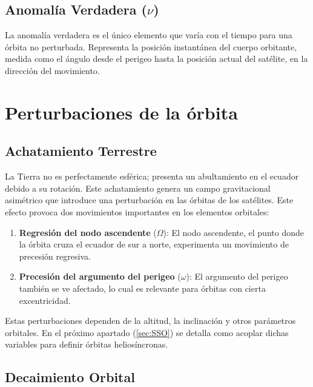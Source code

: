 \subsection{Anomalía Verdadera ($\nu$)}

La anomalía verdadera es el único elemento que varía con el tiempo para una órbita no perturbada. Representa la posición instantánea del cuerpo orbitante, medida como el ángulo desde el perigeo hasta la posición actual del satélite, en la dirección del movimiento.


\section{Perturbaciones de la órbita}

\subsection{Achatamiento Terrestre}

La Tierra no es perfectamente esférica; presenta un abultamiento en el ecuador debido a su rotación. Este achatamiento genera un campo gravitacional asimétrico que introduce una perturbación en las órbitas de los satélites. Este efecto provoca dos movimientos importantes en los elementos orbitales:

\begin{enumerate}
    \item \textbf{Regresión del nodo ascendente} (\( \Omega \)): El nodo ascendente, el punto donde la órbita cruza el ecuador de sur a norte, experimenta un movimiento de precesión regresiva.
    \item \textbf{Precesión del argumento del perigeo} (\( \omega \)): El argumento del perigeo también se ve afectado, lo cual es relevante para órbitas con cierta excentricidad.
\end{enumerate}

Estas perturbaciones dependen de la altitud, la inclinación y otros parámetros orbitales. En el próximo apartado (\ref{sec:SSO}) se detalla como acoplar dichas variables para definir órbitas heliosíncronas.



\subsection{Decaimiento Orbital}


